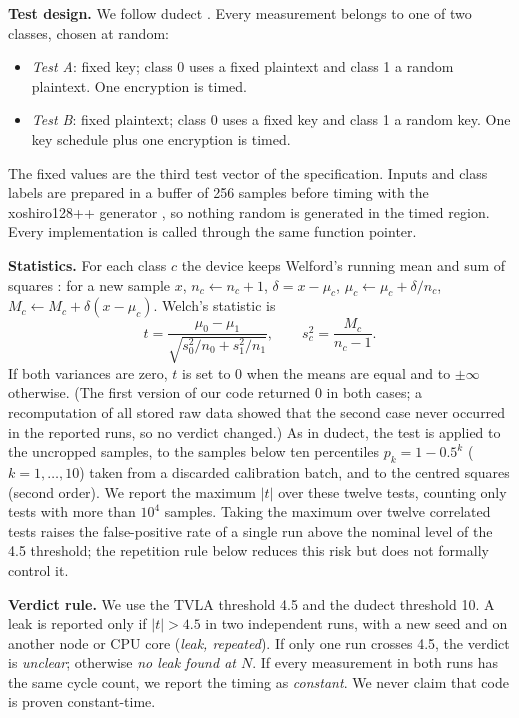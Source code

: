 \documentclass[11pt, a4paper, twoside, reqno]{article}
\begin{document}
\textbf{Test design.} We follow dudect \citep{reparaz2017}. Every measurement belongs to one of two classes, chosen at random:
\begin{itemize}
\item \emph{Test A}: fixed key; class 0 uses a fixed plaintext and class 1 a random plaintext. One encryption is timed.
\item \emph{Test B}: fixed plaintext; class 0 uses a fixed key and class 1 a random key. One key schedule plus one encryption is timed.
\end{itemize}
The fixed values are the third test vector of the specification. Inputs and class labels are prepared in a buffer of 256 samples before timing with the xoshiro128++ generator \citep{blackman2021}, so nothing random is generated in the timed region. Every implementation is called through the same function pointer.

\textbf{Statistics.} For each class $c$ the device keeps Welford's running mean and sum of squares \citep{welford1962}: for a new sample $x$, $n_c\leftarrow n_c+1$, $\delta=x-\mu_c$, $\mu_c\leftarrow\mu_c+\delta/n_c$, $M_c\leftarrow M_c+\delta(x-\mu_c)$. Welch's statistic is
\begin{equation}
t=\frac{\mu_0-\mu_1}{\sqrt{s_0^2/n_0+s_1^2/n_1}},\qquad s_c^2=\frac{M_c}{n_c-1}.
\end{equation}
If both variances are zero, $t$ is set to 0 when the means are equal and to $\pm\infty$ otherwise. (The first version of our code returned 0 in both cases; a recomputation of all stored raw data showed that the second case never occurred in the reported runs, so no verdict changed.) As in dudect, the test is applied to the uncropped samples, to the samples below ten percentiles $p_k=1-0.5^k$ ($k=1,\dots,10$) taken from a discarded calibration batch, and to the centred squares (second order). We report the maximum $|t|$ over these twelve tests, counting only tests with more than $10^4$ samples. Taking the maximum over twelve correlated tests raises the false-positive rate of a single run above the nominal level of the 4.5 threshold; the repetition rule below reduces this risk but does not formally control it.

\textbf{Verdict rule.} We use the TVLA threshold 4.5 and the dudect threshold 10. A leak is reported only if $|t|>4.5$ in two independent runs, with a new seed and on another node or CPU core (\emph{leak, repeated}). If only one run crosses 4.5, the verdict is \emph{unclear}; otherwise \emph{no leak found at $N$}. If every measurement in both runs has the same cycle count, we report the timing as \emph{constant}. We never claim that code is proven constant-time.
\end{document}

